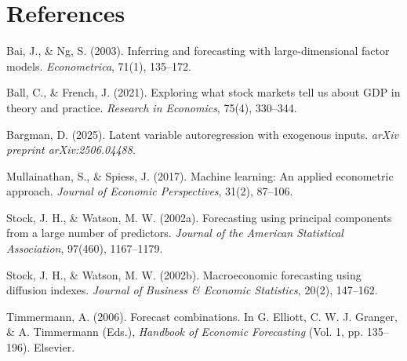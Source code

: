 \documentclass[11pt,letterpaper]{article}
\theoremstyle{plain}
\theoremstyle{definition}
\theoremstyle{remark}
\begin{document}
\newpage

\section*{References}

\begingroup
\renewcommand{\section}[2]{}
\begin{thebibliography}{10}

Bai, J., \& Ng, S. (2003).
\newblock Inferring and forecasting with large-dimensional factor models.
\newblock \textit{Econometrica}, 71(1), 135--172.

Ball, C., \& French, J. (2021).
\newblock Exploring what stock markets tell us about GDP in theory and practice.
\newblock \textit{Research in Economics}, 75(4), 330--344.

Bargman, D. (2025).
\newblock Latent variable autoregression with exogenous inputs.
\newblock \textit{arXiv preprint arXiv:2506.04488}.

Mullainathan, S., \& Spiess, J. (2017).
\newblock Machine learning: An applied econometric approach.
\newblock \textit{Journal of Economic Perspectives}, 31(2), 87--106.

Stock, J. H., \& Watson, M. W. (2002a).
\newblock Forecasting using principal components from a large number of predictors.
\newblock \textit{Journal of the American Statistical Association}, 97(460), 1167--1179.

Stock, J. H., \& Watson, M. W. (2002b).
\newblock Macroeconomic forecasting using diffusion indexes.
\newblock \textit{Journal of Business \& Economic Statistics}, 20(2), 147--162.

Timmermann, A. (2006).
\newblock Forecast combinations.
\newblock In G. Elliott, C. W. J. Granger, \& A. Timmermann (Eds.), \textit{Handbook of Economic Forecasting} (Vol. 1, pp. 135--196). Elsevier.

\end{thebibliography}
\endgroup

\newpage

\section*{Appendix: Implementation Details}
\end{document}
